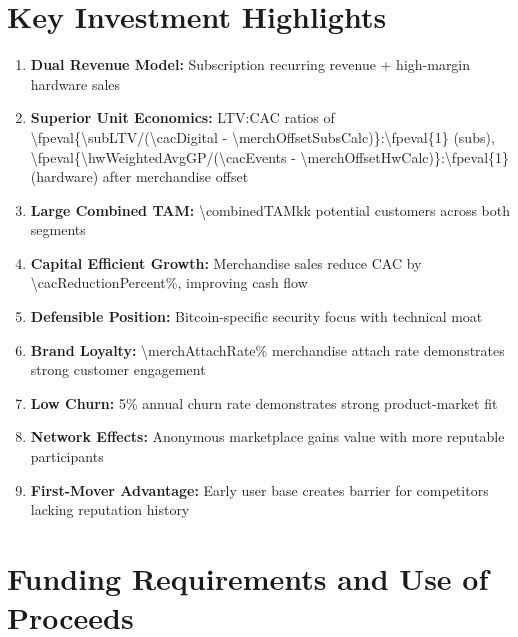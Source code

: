 \documentclass[11pt]{article}
\newcommand{\numint}[1]{\num[round-precision=0]{\fpeval{#1}}}
\begin{document}
\section{Key Investment Highlights}

\begin{enumerate}
  \item \textbf{Dual Revenue Model:} Subscription recurring revenue + high-margin hardware sales
  \item \textbf{Superior Unit Economics:} LTV:CAC ratios of \numint{\subLTV/(\cacDigital - \merchOffsetSubsCalc)}:\numint{1} (subs), \numint{\hwWeightedAvgGP/(\cacEvents - \merchOffsetHwCalc)}:\numint{1} (hardware) after merchandise offset
  \item \textbf{Large Combined TAM:} \num{\combinedTAMk}k potential customers across both segments
  \item \textbf{Capital Efficient Growth:} Merchandise sales reduce CAC by \num{\cacReductionPercent}\%, improving cash flow
  \item \textbf{Defensible Position:} Bitcoin-specific security focus with technical moat
  \item \textbf{Brand Loyalty:} \num{\merchAttachRate}\% merchandise attach rate demonstrates strong customer engagement
  \item \textbf{Low Churn:} \num{5}\% annual churn rate demonstrates strong product-market fit
  \item \textbf{Network Effects:} Anonymous marketplace gains value with more reputable participants
  \item \textbf{First-Mover Advantage:} Early user base creates barrier for competitors lacking reputation history
\end{enumerate}

\section{Funding Requirements and Use of Proceeds}
\end{document}
